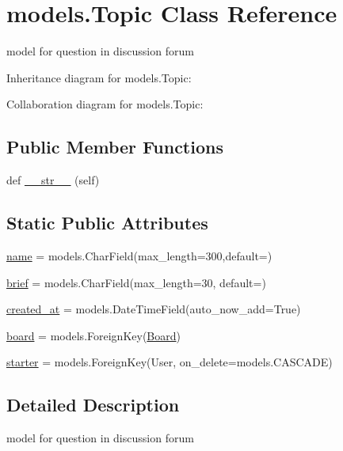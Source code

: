 \hypertarget{classmodels_1_1_topic}{}\section{models.\+Topic Class Reference}
\label{classmodels_1_1_topic}


model for question in discussion forum  




Inheritance diagram for models.\+Topic\+:


Collaboration diagram for models.\+Topic\+:
\subsection*{Public Member Functions}
\begin{DoxyCompactItemize}
\item 
def \hyperlink{classmodels_1_1_topic_acfda0b304b96b45ac8afce34db053fc7}{\+\_\+\+\_\+str\+\_\+\+\_\+} (self)
\end{DoxyCompactItemize}
\subsection*{Static Public Attributes}
\begin{DoxyCompactItemize}
\item 
\hyperlink{classmodels_1_1_topic_acd7ecf27aa6c6ec4aeb1a1e2884a9f43}{name} = models.\+Char\+Field(max\+\_\+length=300,default=\textquotesingle{}\textquotesingle{})
\item 
\hyperlink{classmodels_1_1_topic_a4eb8fa5c1ed142be16d2c318c727d4c0}{brief} = models.\+Char\+Field(max\+\_\+length=30, default=\textquotesingle{}\textquotesingle{})
\item 
\hyperlink{classmodels_1_1_topic_a18646db3f9d9db5f01907841d02b08b0}{created\+\_\+at} = models.\+Date\+Time\+Field(auto\+\_\+now\+\_\+add=True)
\item 
\hyperlink{classmodels_1_1_topic_ac20c528d9944ec119f7c6ae797a44bd5}{board} = models.\+Foreign\+Key(\hyperlink{classmodels_1_1_board}{Board})
\item 
\hyperlink{classmodels_1_1_topic_a1ae6fd4bdbc0bde3b0da3f648a839616}{starter} = models.\+Foreign\+Key(User, on\+\_\+delete=models.\+C\+A\+S\+C\+A\+DE)
\end{DoxyCompactItemize}


\subsection{Detailed Description}
model for question in discussion forum 

